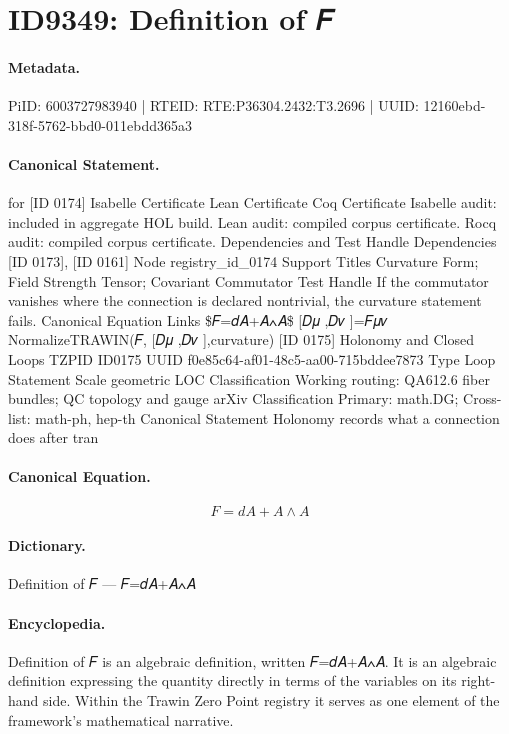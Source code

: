 \section*{ID9349: Definition of 𝐹}
\paragraph{Metadata.}
PiID: 6003727983940 | RTEID: RTE:P36304.2432:T3.2696 | UUID: 12160ebd-318f-5762-bbd0-011ebdd365a3

\paragraph{Canonical Statement.}
for [ID 0174] Isabelle Certificate Lean Certificate Coq Certificate Isabelle audit: included in aggregate HOL build. Lean audit: compiled corpus certificate. Rocq audit: compiled corpus certificate. Dependencies and Test Handle Dependencies [ID 0173], [ID 0161] Node registry\_id\_0174 Support Titles Curvature Form; Field Strength Tensor; Covariant Commutator Test Handle If the commutator vanishes where the connection is declared nontrivial, the curvature statement fails. Canonical Equation Links \$𝐹=𝑑𝐴+𝐴∧𝐴\$ [𝐷𝜇 ,𝐷𝜈 ]=𝐹𝜇𝜈 NormalizeTRAWIN(𝐹, [𝐷𝜇 ,𝐷𝜈 ],curvature) [ID 0175] Holonomy and Closed Loops TZPID ID0175 UUID f0e85c64-af01-48c5-aa00-715bddee7873 Type Loop Statement Scale geometric LOC Classification Working routing: QA612.6 fiber bundles; QC topology and gauge arXiv Classification Primary: math.DG; Cross-list: math-ph, hep-th Canonical Statement Holonomy records what a connection does after tran

\paragraph{Canonical Equation.}
\[
𝐹=𝑑𝐴+𝐴∧𝐴
\]

\paragraph{Dictionary.}
Definition of 𝐹 — 𝐹=𝑑𝐴+𝐴∧𝐴

\paragraph{Encyclopedia.}
Definition of 𝐹 is an algebraic definition, written 𝐹=𝑑𝐴+𝐴∧𝐴. It is an algebraic definition expressing the quantity directly in terms of the variables on its right-hand side. Within the Trawin Zero Point registry it serves as one element of the framework's mathematical narrative.
